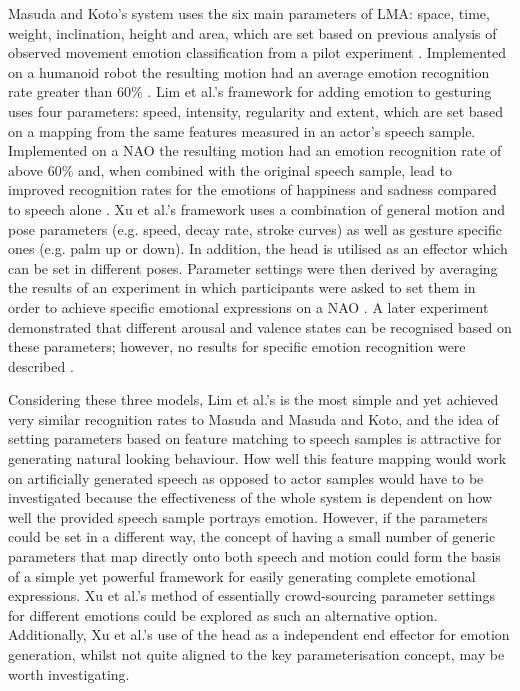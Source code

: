 \documentclass[11pt,a4paper]{report}
\begin{document}
Masuda and Koto's system uses the six main parameters of LMA: space, time, weight, inclination, height and area, which are set based on previous analysis of observed movement emotion classification from a pilot experiment \citep{masuda2009emotion}. Implemented on a humanoid robot the resulting motion had an average emotion recognition rate greater than 60\% \citep{masuda2010motion}. Lim et al.'s framework for adding emotion to gesturing uses four parameters: speed, intensity, regularity and extent, which are set based on a mapping from the same features measured in an actor's speech sample. Implemented on a NAO the resulting motion had an emotion recognition rate of above 60\% and, when combined with the original speech sample, lead to improved recognition rates for the emotions of happiness and sadness compared to speech alone \citep{lim2011converting}. Xu et al.'s framework uses a combination of general motion and pose parameters (e.g. speed, decay rate, stroke curves) as well as gesture specific ones (e.g. palm up or down). In addition, the head is utilised as an effector which can be set in different poses. Parameter settings were then derived by averaging the results of an experiment in which participants were asked to set them in order to achieve specific emotional expressions on a NAO \citep{xu2013mood}. A later experiment demonstrated that different arousal and valence states can be recognised based on these parameters; however, no results for specific emotion recognition were described \citep{xu2013bodily}.

Considering these three models, Lim et al.'s is the most simple and yet achieved very similar recognition rates to Masuda and Masuda and Koto, and the idea of setting parameters based on feature matching to speech samples is attractive for generating natural looking behaviour. How well this feature mapping would work on artificially generated speech as opposed to actor samples would have to be investigated because the effectiveness of the whole system is dependent on how well the provided speech sample portrays emotion. However, if the parameters could be set in a different way, the concept of having a small number of generic parameters that map directly onto both speech and motion could form the basis of a simple yet powerful framework for easily generating complete emotional expressions. Xu et al.'s method of essentially crowd-sourcing parameter settings for different emotions could be explored as such an alternative option. Additionally, Xu et al.'s use of the head as a independent end effector for emotion generation, whilst not quite aligned to the key parameterisation concept, may be worth investigating. 
\end{document}
